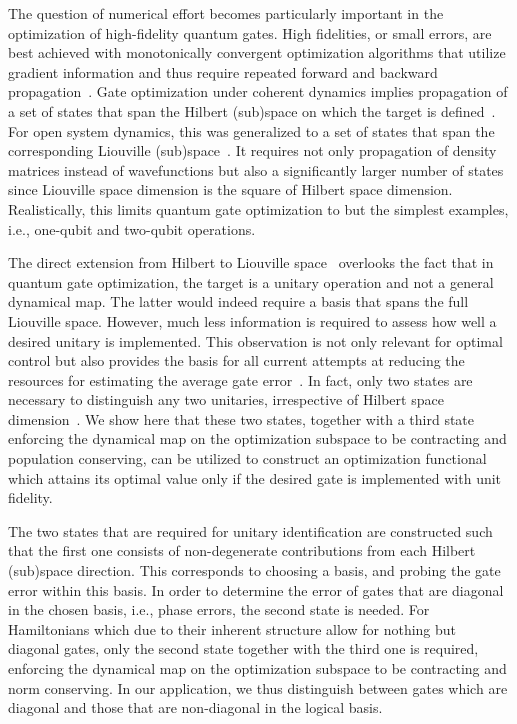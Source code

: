 The question of numerical effort becomes particularly important in the
optimization of high-fidelity quantum gates. High
fidelities, or small errors,  are best achieved with monotonically convergent
optimization algorithms that utilize 
gradient information and thus require repeated forward and backward
propagation~\cite{SomloiCP93,ZhuJCP98}. Gate optimization under
coherent dynamics implies propagation of a set of states that span the 
Hilbert (sub)space on which the target is
defined~\cite{JosePRL02,JosePRA03}. For open system dynamics, this was
generalized to a set of states that span the corresponding Liouville
(sub)space~\cite{KallushPRA06,OhtsukiNJP10,ToSHJPB11,FloetherNJP12}. It
requires not only propagation of density matrices instead of
wavefunctions but also a significantly larger number of states
since Liouville space dimension is the square of Hilbert space
dimension. Realistically, this limits quantum gate optimization to but 
the simplest examples, i.e., one-qubit and two-qubit operations. 

The direct extension from Hilbert to
Liouville space~\cite{KallushPRA06,OhtsukiNJP10,ToSHJPB11} 
overlooks the fact that in quantum gate optimization,
the target is a unitary operation and not a general dynamical map. The
latter would indeed require a basis that spans the full Liouville
space. However, much less information is required to assess how
well a desired unitary is implemented. This observation is not only
relevant for optimal control but also provides the
basis for all current attempts at reducing the resources for
estimating the average gate
error~\cite{BenderskyPRL08,FlammiaPRL11,MagesanPRL11,daSilvaPRL11,ReichKochPRL13}. 
In fact, only two states are necessary to distinguish any two
unitaries, irrespective of Hilbert space
dimension~\cite{ReichKochPRA13}. 
We show here that these two states,
together with a third state enforcing the dynamical map on the
optimization subspace to be
contracting and population conserving,
can be utilized to construct an optimization functional
which attains its optimal value only if the desired gate is
implemented with unit fidelity. 

The two states that are required for unitary identification are
constructed such that the first one consists of non-degenerate
contributions from each Hilbert (sub)space direction. This corresponds
to choosing a basis, and probing the gate error within this basis. In
order to determine the error of gates that are diagonal in the chosen
basis, i.e., phase errors, the second state is needed. For Hamiltonians
which due to their inherent structure allow for nothing but diagonal gates, 
only the second state together with the third one is required, enforcing the
dynamical map on the optimization subspace to be contracting and
norm conserving. In our application, we
thus distinguish between gates which are diagonal and those that are
non-diagonal in the logical basis. 

